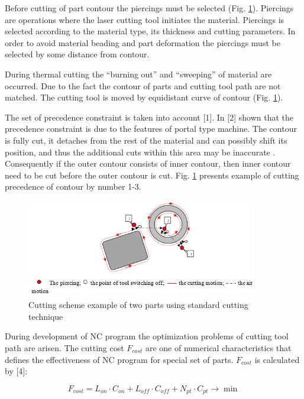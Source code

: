\documentclass[runningheads]{llncs}
\begin{document}
Before cutting of part contour the piercings must be selected (Fig. \ref{elements}).
Piercings are operations where the laser cutting tool initiates the material.
Piercings is selected according to the material type, its thickness and cutting parameters.
In order to avoid material beading and part deformation the piercings must be selected by some distance from contour.

During thermal cutting the ``burning out'' and ``sweeping'' of material are occurred.
Due to the fact the contour of parts and cutting tool path are not matched.
The cutting tool is moved by equidistant curve of contour (Fig. \ref{elements}).

The set of precedence constraint is taken into account [1].
In [2] shown that the precedence constraint is due to the features of portal type machine.
The contour is fully cut, it detaches from the rest of the material and can possibly shift its position,
and thus the additional cuts within this area may be inaccurate \cite{Dewil2015}.
Consequently if the outer contour consists of inner contour,
then inner contour need to be cut before the outer contour is cut.
Fig. \ref{elements} presents example of cutting precedence of contour by number 1-3.

\begin{figure}
  \begin{center}
  \includegraphics[width=0.9\textwidth]{elements.png}
  \caption{Cutting scheme example of two parts using standard cutting technique}
  \label{elements}
  \end{center}
\end{figure}

During development of NC program the optimization problems of cutting tool path are arisen.
The cutting cost $F_{cost}$ are one of numerical characteristics
that defines the effectiveness of NC program for special set of parts.
$F_{cost}$ is calculated by [4]:

\begin{equation}
F_{cost} =
L_{on} \cdot C_{on} +
L_{off} \cdot C_{off} +
N_{pt} \cdot C_{pt}
\to \min
\label{cost}
\end{equation}
\end{document}

